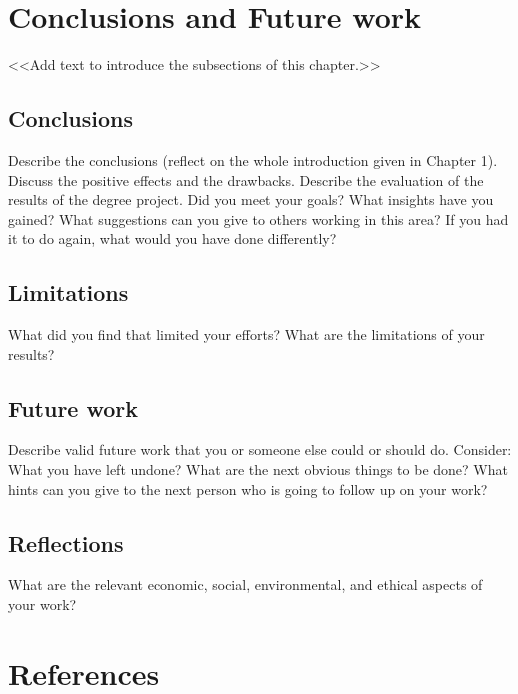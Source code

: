\documentclass[a4paper,12pt,twocolumn]{article}
\numberwithin{figure}{section}
\numberwithin{table}{section}
\begin{document}
\section{Conclusions and Future work}
<<Add text to introduce the subsections of this chapter.>>

\subsection{Conclusions}
Describe the conclusions (reflect on the whole introduction given in Chapter 1).
Discuss the positive effects and the drawbacks.
Describe the evaluation of the results of the degree project.
Did you meet your goals?
What insights have you gained?
What suggestions can you give to others working in this area?
If you had it to do again, what would you have done differently?

\subsection{Limitations}
What did you find that limited your efforts? What are the limitations of your results?

\subsection{Future work}
Describe valid future work that you or someone else could or should do.
Consider: What you have left undone? What are the next obvious things to be done? What hints
can you give to the next person who is going to follow up on your work?

\subsection{Reflections}
What are the relevant economic, social, environmental, and ethical aspects of your work?





\onecolumn
\section{References}

\nocite{*}




\newpage
\appendix  %
{} %
\end{document}
